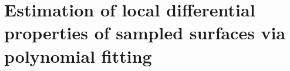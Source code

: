 \chapter{Estimation of local differential properties of sampled
surfaces via polynomial fitting}
\label{chapter-Jet_fitting_3}

\minitoc


  